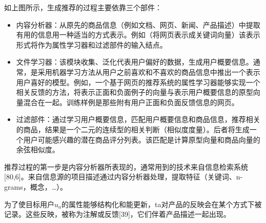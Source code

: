 如上图所示，生成推荐的过程主要依靠三个部件：
\begin{itemize}
	\item 内容分析器：从原先的商品信息（例如文档、网页、新闻、产品描述）中提取有用的信息用一种适当的方式表示。例如（将网页表示成关键词向量）该表示形式将作为属性学习器和过滤部件的输入结点。
	\item 文件学习器：该模块收集、泛化代表用户偏好的数据，生成用户概要信息。通常，是采用机器学习方法从用户之前喜欢和不喜欢的商品信息中推出一个表示用户喜好的模型。例如，一个基于网页的推荐系统的属性学习器能够实现一个相关反馈的方法，将表示正面和负面例子的向量与表示用户概要信息的原型向量混合在一起。训练样例是那些附有用户正面和负面反馈信息的网页。
	\item  过滤部件：通过学习用户概要信息，匹配用户概要信息和商品信息，推荐相关的商品，结果是一个二元的连续型的相关判断（相似度度量）。后者将生成一个用户可能感兴趣的潜在商品评分列表。该匹配是计算原型向量和商品向量的余弦相似度。
\end{itemize} 

推荐过程的第一步是内容分析器所表现的，通常用到的技术来自信息检索系统[80,6]。来自信息源的项目描述通过内容分析器处理，提取特征（关键词、n-grams，概念，\dots）。

为了使目标用户$ u_a $的属性能够结构化和能更新，ta对产品的反映会在某个方式下被记录。这些反映，被称为注解或反馈[39]，它们伴着产品描述一起出现。



